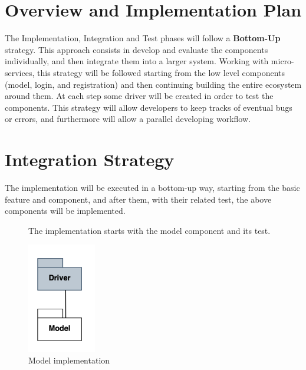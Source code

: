 \section{Overview and Implementation Plan}
The Implementation, Integration and Test phases will follow a \textbf{Bottom-Up} strategy. This approach consists in develop and evaluate the components individually, and then integrate them into a larger system. Working with micro-services, this strategy will be followed starting from the low level components (model, login, and registration) and then continuing building the entire ecosystem around them. At each step some driver will be created in order to test the components. This strategy will allow developers to keep tracks of eventual bugs or errors, and furthermore will allow a parallel developing workflow.

\section{Integration Strategy}
The implementation will be executed in a bottom-up way, starting from the basic feature and component, and after them, with their related test, the above components will be implemented.

\begin{figure}[H]
The implementation starts with the model component and its test.
    \begin{center}
        \includegraphics[width=3cm]{images/IntegrationStrategy/model.png}
        \caption{Model implementation}
    \end{center}
\end{figure}

